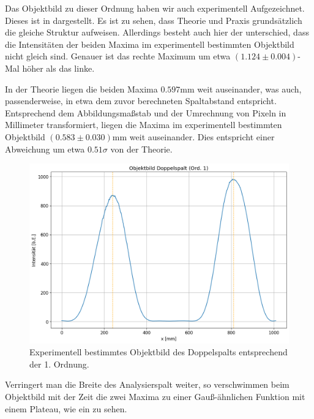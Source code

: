 Das Objektbild zu dieser Ordnung haben wir auch experimentell Aufgezeichnet. Dieses ist in  dargestellt. Es ist zu sehen, dass Theorie und Praxis grundsätzlich die gleiche Struktur aufweisen. Allerdings besteht auch hier der unterschied, dass die Intensitäten der beiden Maxima im experimentell bestimmten Objektbild nicht gleich sind. Genauer ist das rechte Maximum um etwa $(1.124 \pm 0.004)$-Mal höher als das linke.

In der Theorie liegen die beiden Maxima $0.597\si{\milli\meter}$ weit auseinander, was auch, passenderweise, in etwa dem zuvor berechneten Spaltabstand entspricht. Entsprechend dem Abbildungsmaßstab und der Umrechnung von Pixeln in Millimeter transformiert, liegen die Maxima im experimentell bestimmten Objektbild $(0.583 \pm 0.030)\si{\milli\meter}$ weit auseinander. Dies entspricht einer Abweichung um etwa $0.51\sigma$ von der Theorie.

\begin{figure}[H]
  \centering
  \includegraphics[width=.9\textwidth]{files/plots/5/ds_praxis_objektbild_ord1.png}
  \caption{Experimentell bestimmtes Objektbild des Doppelspalts entsprechend der 1. Ordnung.}
  \label{fig:ds_praxis_objektbild_ord1}
\end{figure}

Verringert man die Breite des Analysierspalt weiter, so verschwimmen beim Objektbild mit der Zeit die zwei Maxima zu einer \glqq{}Gauß-ähnlichen\grqq{} Funktion mit einem Plateau, wie ein  zu sehen.


